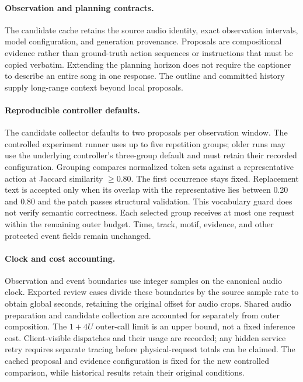 \paragraph{Observation and planning contracts.}
The candidate cache retains the source audio identity, exact observation
intervals, model configuration, and generation provenance. Proposals
are compositional evidence rather than ground-truth action sequences
or instructions that must be copied verbatim. Extending the planning
horizon does not require the captioner to describe an entire song in
one response. The outline and committed history supply long-range
context beyond local proposals.

\paragraph{Reproducible controller defaults.}
The candidate collector defaults to two proposals per observation window.
The controlled experiment runner uses up to five repetition groups;
older runs may use the underlying controller's three-group default and
must retain their recorded configuration. Grouping compares normalized
token sets against a representative action at Jaccard similarity
$\geq0.80$. The first occurrence stays fixed. Replacement text is accepted
only when its overlap with the representative lies between 0.20 and
0.80 and the patch passes structural validation. This vocabulary guard
does not verify semantic correctness. Each selected group receives at
most one request within the remaining outer budget. Time, track, motif,
evidence, and other protected event fields remain unchanged.

\paragraph{Clock and cost accounting.}
Observation and event boundaries use integer samples on the canonical
audio clock. Exported review cases divide these boundaries by the source
sample rate to obtain global seconds, retaining the original offset for
audio crops. Shared audio preparation and candidate collection are
accounted for separately from outer composition. The $1+4U$ outer-call
limit is an upper bound, not a fixed inference cost. Client-visible
dispatches and their usage are recorded; any hidden service retry
requires separate tracing before physical-request totals can be claimed.
The cached proposal and evidence configuration is fixed for the new
controlled comparison, while historical results retain their original
conditions.

